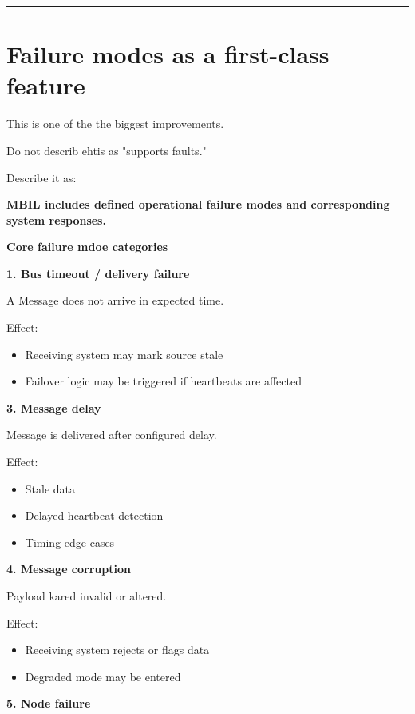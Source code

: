 \documentclass{report}
\begin{document}
\begin{center}
\rule{0.9\textwidth}{1pt}
\end{center}
\section{Failure modes as a first-class feature}

This is one of the the biggest improvements. 

Do not describ ehtis as "supports faults."

Describe it as:

\textbf{MBIL includes defined operational failure modes and corresponding system responses.}

\textbf{Core failure mdoe categories}

\textbf{1. Bus timeout / delivery failure}

A Message does not arrive in expected time.  

Effect:
\begin{itemize}
   \item Receiving system may mark source stale
   \item Failover logic may be triggered if heartbeats are affected
\end{itemize}

\textbf{3. Message delay}

Message is delivered after configured delay. 

Effect:
\begin{itemize}
   \item Stale data
   \item Delayed heartbeat detection
   \item Timing edge cases
\end{itemize}

\textbf{4. Message corruption}

Payload kared invalid or altered. 

Effect:
\begin{itemize}
   \item Receiving system rejects or flags data
   \item Degraded mode may be entered
\end{itemize}

\textbf{5. Node failure}
\end{document}

